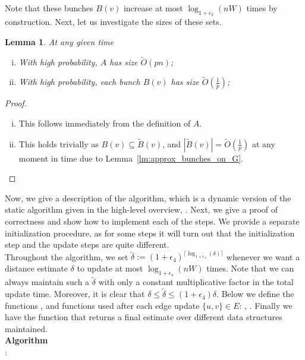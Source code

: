 \documentclass[11pt]{article}
\newtheorem{lemma}[theorem]{Lemma}
\theoremstyle{definition}
\theoremstyle{remark}
\begin{document}
 Note that these bunches $B(v)$ increase at most $\log_{1+\epsilon_3}(nW)$ times by construction.
Next, let us investigate the sizes of these sets. 

\begin{lemma}\label{lm:size_heavy}
 At any given time
\begin{enumerate}[(i)]
    \item With high probability, $ A $ has size $\tilde O (p n) $; \label{item:size_A}
    \item With high probability, each bunch $B(v)$ has size $\tilde O (\tfrac{1}{p}) $;  \label{item:size_bunch}
\end{enumerate}
\end{lemma}
\begin{proof}
\begin{enumerate}[(i)]
    \item This follows immediately from the definition of $A$. 
    \item This holds trivially as $B(v)\subseteq \tilde B(v)$, and $|\tilde{B}(v)|=\tilde O(\tfrac{1}{p})$ at any moment in time due to Lemma~\ref{lm:approx_bunches_on_G}.\qedhere
\end{enumerate}
\end{proof}


Now, we give a description of the algorithm, which is a dynamic version of the static algorithm given in the high-level overview, . Next, we give a proof of correctness and show how to implement each of the steps. We provide a separate initialization procedure, as for some steps it will turn out that the initialization step and the update steps are quite different.\\
Throughout the algorithm, we set $\tilde\delta := (1+\epsilon_4)^{\lceil \log_{1+\epsilon_4}(\delta)\rceil}$ whenever we want a distance estimate $\delta$ to update at most $\log_{1+\epsilon_4}(nW)$ times. Note that we can always maintain such a $\tilde \delta$ with only a constant multiplicative factor in the total update time. Moreover, it is clear that $\delta \leq \tilde \delta \leq (1+\epsilon_4)\delta$.
Below we define the functions \Initialization{}, and functions used after each edge update $\{u,v\}\in E$: , . Finally we have the \Query{} function that returns a final estimate over different data structures maintained. 
\\ 

\noindent
\textbf{Algorithm} \\
\Initialization{}:
\end{document}
